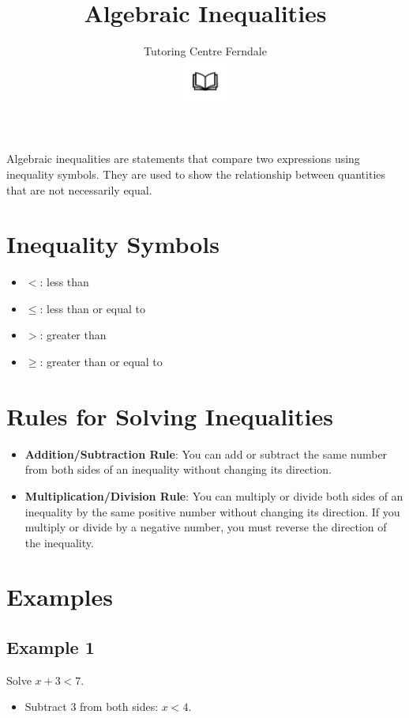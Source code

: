 \documentclass[12pt]{article}
\title{Algebraic Inequalities}\\
\author{Tutoring Centre Ferndale\\
\includegraphics[width=4em]{ApS_logo.png}}
\date{}
\begin{document}
\maketitle

Algebraic inequalities are statements that compare two expressions using inequality symbols. They are used to show the relationship between quantities that are not necessarily equal.

\section*{Inequality Symbols}

\begin{itemize}
    \item \( < \): less than
    \item \( \leq \): less than or equal to
    \item \( > \): greater than
    \item \( \geq \): greater than or equal to
\end{itemize}

\section*{Rules for Solving Inequalities}

\begin{itemize}
    \item \textbf{Addition/Subtraction Rule}: You can add or subtract the same number from both sides of an inequality without changing its direction.
    \item \textbf{Multiplication/Division Rule}: You can multiply or divide both sides of an inequality by the same positive number without changing its direction. If you multiply or divide by a negative number, you must reverse the direction of the inequality.
\end{itemize}

\section*{Examples}

\subsection*{Example 1}

Solve \( x + 3 < 7 \).

\begin{itemize}
    \item Subtract 3 from both sides: \( x < 4 \).
\end{itemize}
\end{document}

